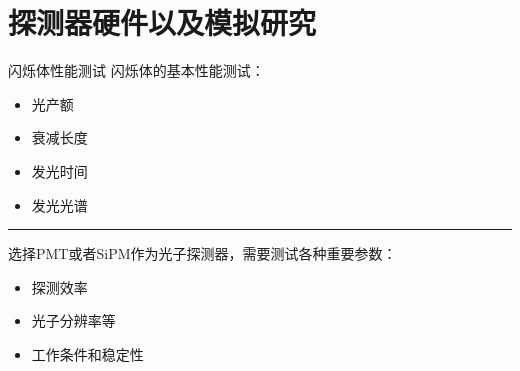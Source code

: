 \documentclass[11pt,compress,xcolor=x11names,UTF8]{beamer}
\begin{document}
\section{探测器硬件以及模拟研究}
\begin{frame}{闪烁体性能测试}
闪烁体的基本性能测试：
\begin{itemize}
\item 光产额
\item 衰减长度
\item 发光时间
\item 发光光谱
\end{itemize}
\vspace{.5cm}
\hrule{\textwidth}
\vspace{.5cm}

选择PMT或者SiPM作为光子探测器，需要测试各种重要参数：
\begin{itemize}
\item 探测效率
\item 光子分辨率等
\item 工作条件和稳定性
\end{itemize}
\end{frame}

\end{document}
